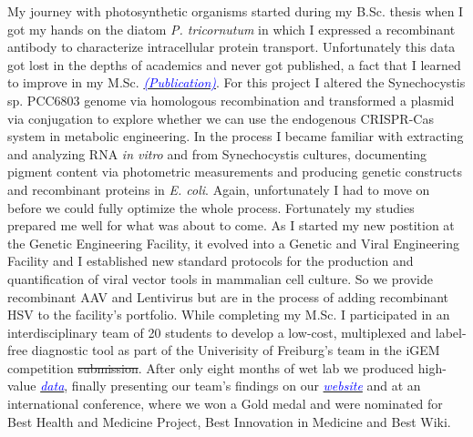 \documentclass[11pt,a4paper,sans]{moderncv}
\begin{document}
\begin{spacing}{1.15}
My journey with photosynthetic organisms started during my B.Sc. thesis when I got my hands on the diatom \textit{P. tricornutum} in which I expressed a recombinant antibody to characterize intracellular protein transport. Unfortunately this data got lost in the depths of academics and never got published, a fact that I learned to improve in my M.Sc. {\href{https://www.ncbi.nlm.nih.gov/pubmed/29517395}{\textcolor{blue}{{\textit{(Publication)}}}}}. For this project I altered the Synechocystis sp. PCC6803 genome via homologous recombination and transformed a plasmid via conjugation to explore whether we can use the endogenous CRISPR-Cas system in metabolic engineering. In the process I became familiar with extracting and analyzing RNA \textit{in vitro} and from Synechocystis cultures, documenting pigment content via photometric measurements and producing genetic constructs and recombinant proteins in \textit{E. coli}. Again, unfortunately I had to move on before we could fully optimize the whole process.
Fortunately my studies prepared me well for what was about to come. 
As I started my new postition at the Genetic Engineering Facility, it evolved into a  Genetic and Viral Engineering Facility and I established new standard protocols for the production and quantification of viral vector tools in mammalian cell culture. So we provide recombinant AAV and Lentivirus but are in the process of adding recombinant HSV to the facility's portfolio.
While completing my M.Sc. I participated in an interdisciplinary team of 20 students to develop a low-cost, multiplexed and label-free diagnostic tool as part of the Univerisity of Freiburg's team in the iGEM competition
\sout{submission}.
After only eight months of wet lab we produced high-value  {\href{https://www.ncbi.nlm.nih.gov/pubmed/29803867}{\textcolor{blue}{\textit{data}}}}, finally presenting our team's findings on our {\href{http://2015.igem.org/Team:Freiburg}{\textcolor{blue}{\textit{website}}}} and at an international conference, where we won a Gold medal and were nominated for Best Health and Medicine Project, Best Innovation in
Medicine and Best Wiki.
\par%

\end{spacing}
\end{document}
